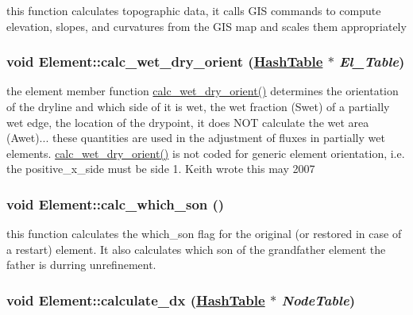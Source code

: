this function calculates topographic data, it calls GIS commands to compute elevation, slopes, and curvatures from the GIS map and scales them appropriately 

\hypertarget{classElement_a129}{
\subsubsection[calc\_\-wet\_\-dry\_\-orient]{\setlength{\rightskip}{0pt plus 5cm}void Element::calc\_\-wet\_\-dry\_\-orient (\hyperlink{classHashTable}{Hash\-Table} $\ast$ {\em El\_\-Table})}}
\label{classElement_a129}


the element member function \hyperlink{classElement_a129}{calc\_\-wet\_\-dry\_\-orient()} determines the orientation of the dryline and which side of it is wet, the wet fraction (Swet) of a partially wet edge, the location of the drypoint, it does NOT calculate the wet area (Awet)... these quantities are used in the adjustment of fluxes in partially wet elements. \hyperlink{classElement_a129}{calc\_\-wet\_\-dry\_\-orient()} is not coded for generic element orientation, i.e. the positive\_\-x\_\-side must be side 1. Keith wrote this may 2007 

\hypertarget{classElement_a46}{
\subsubsection[calc\_\-which\_\-son]{\setlength{\rightskip}{0pt plus 5cm}void Element::calc\_\-which\_\-son ()}}
\label{classElement_a46}


this function calculates the which\_\-son flag for the original (or restored in case of a restart) element. It also calculates which son of the grandfather element the father is durring unrefinement. 

\hypertarget{classElement_a73}{
\subsubsection[calculate\_\-dx]{\setlength{\rightskip}{0pt plus 5cm}void Element::calculate\_\-dx (\hyperlink{classHashTable}{Hash\-Table} $\ast$ {\em Node\-Table})}}
\label{classElement_a73}


